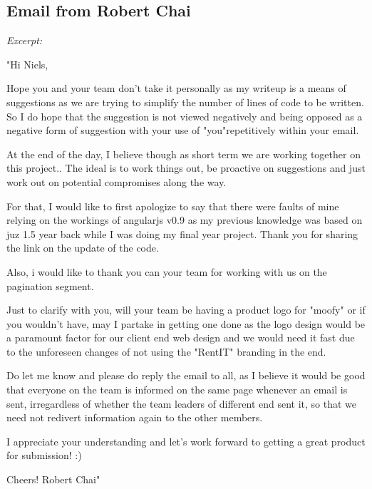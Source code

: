 \subsection{Email from Robert Chai}
\label{app:robertsletter}
\emph{Excerpt:}

"Hi Niels,

Hope you and your team don't take it personally as my writeup is a means of
suggestions as we are trying to simplify the number of lines of code to be
written. So I do hope that the suggestion is not viewed negatively and being
opposed as a negative form of suggestion with your use of "you"repetitively
within your email.

At the end of the day, I believe though as short term we are working together
on this project.. The ideal is to work things out, be proactive on suggestions
and just work out on potential compromises along the way.

For that, I would like to first apologize to say that there were faults of mine
relying on the workings of angularjs v0.9 as my previous knowledge was based on
juz 1.5 year back while I was doing my final year project. Thank you for
sharing the link on the update of the code.

Also, i would like to thank you can your team for working with us on the
pagination segment.

Just to clarify with you, will your team be having a product logo for "moofy" or if you wouldn't have, may I partake in getting one done as the logo design would be a paramount factor for our client end web design and we would need it fast due to the unforeseen changes of not using the "RentIT" branding in the end.

Do let me know and please do reply the email to all, as I believe it would be good that everyone on the team is informed on the same page whenever an email is sent, irregardless of whether the team leaders of different end sent it, so that we need not redivert information again to the other members.

I appreciate your understanding and let's work forward to getting a great product for submission! :)

Cheers! 
Robert Chai"
